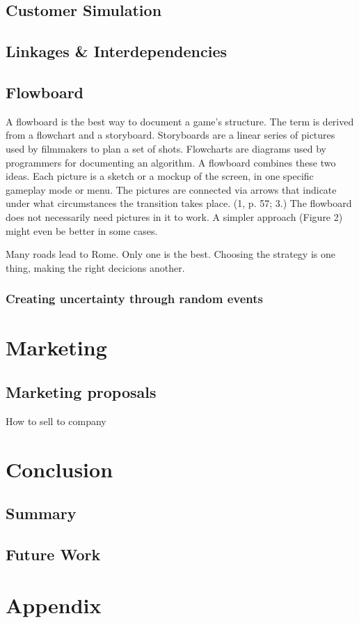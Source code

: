 \documentclass[11pt,titlepage,oneside,openany]{book}
\begin{document}
\section{Customer Simulation}
\label{sec:customsim}

\section{Linkages \& Interdependencies}
\label{sec:link}

\section{Flowboard}

A flowboard is the best way to document a game’s structure. The term is derived
from a flowchart and a storyboard. Storyboards are a linear series of pictures
used by filmmakers to plan a set of shots. Flowcharts are diagrams used
by programmers for documenting an algorithm. A flowboard combines these
two ideas. Each picture is a sketch or a mockup of the screen, in one specific
gameplay mode or menu. The pictures are connected via arrows that indicate
under what circumstances the transition takes place. (1, p. 57; 3.) The flowboard
does not necessarily need pictures in it to work. A simpler approach (Figure
2) might even be better in some cases.

Many roads lead to Rome. Only one is the best. Choosing the strategy is one thing, making the right decicions another. 

\subsection{Creating uncertainty through random events}

\chapter{Marketing}
\label{cha:exp}

\section{Marketing proposals}
\label{sec:setting}
How to sell to company


\chapter{Conclusion}
\label{cha:conclusion}


\section{Summary}
\label{sec:sum}

\section{Future Work}
\label{sec:future}





\appendix

\chapter{Appendix}
\label{cha:appendix-a}

\newpage


\pagestyle{empty}
\end{document}
